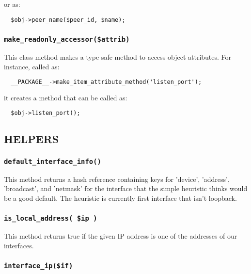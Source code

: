 \documentclass[12pt,a4paper]{article}
\begin{document}
or as:

\begin{verbatim}
  $obj->peer_name($peer_id, $name);
\end{verbatim}
\subsubsection*{\texttt{make\_readonly\_accessor(\$attrib)}\label{xPL::Base_make_readonly_accessor_attrib_}}


This class method makes a type safe method to access object attributes.
For instance, called as:

\begin{verbatim}
  __PACKAGE__->make_item_attribute_method('listen_port');
\end{verbatim}


it creates a method that can be called as:

\begin{verbatim}
  $obj->listen_port();
\end{verbatim}
\subsection*{HELPERS\label{xPL::Base_HELPERS}}
\subsubsection*{\texttt{default\_interface\_info()}\label{xPL::Base_default_interface_info_}}


This method returns a hash reference containing keys for 'device',
'address', 'broadcast', and 'netmask' for the interface that the
simple heuristic thinks would be a good default.  The heuristic
is currently first interface that isn't loopback.

\subsubsection*{\texttt{is\_local\_address( \$ip )}\label{xPL::Base_is_local_address_ip_}}


This method returns true if the given IP address is one of the
addresses of our interfaces.

\subsubsection*{\texttt{interface\_ip(\$if)}\label{xPL::Base_interface_ip_if_}}
\end{document}
